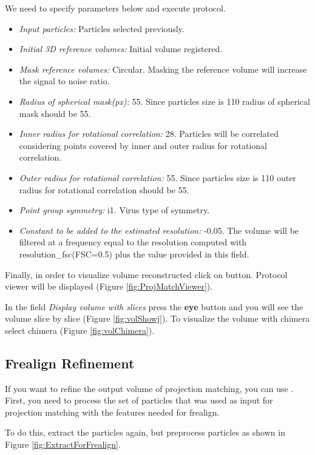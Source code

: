 \documentclass[12pt]{article} %
\begin{document}
 
We need to specify parameters below and execute protocol.
\begin{itemize}
\item \textit{Input particles:} Particles selected previously.
\item \textit{Initial 3D reference volumes:}  Initial volume registered.
\item \textit{Mask reference volumes:} Circular. Masking the reference volume will increase the signal to noise ratio. 
\item \textit{Radius of spherical mask(px):} 55. Since particles size is 110 radius of spherical mask should be 55.
\item \textit{Inner radius for rotational correlation:} 28. Particles will be correlated considering points covered 
by inner and outer radius for rotational correlation.
\item \textit{Outer radius for rotational correlation:} 55. Since particles size is 110 outer radius for rotational correlation should be 55.
\item \textit{Point group symmetry:} i1. Virus type of symmetry.
\item \textit{Constant to be added to the estimated resolution:} -0.05. The volume will be filtered at a frequency equal to
the  resolution computed with resolution\_fsc(FSC=0.5) plus the value provided in this field.

\end{itemize}


Finally, in order to visualize volume reconstructed click on
 button. Protocol viewer will be displayed (Figure \ref{fig:ProjMatchViewer}).


In the field 
\textit{Display volume with slices } press the \textbf {eye} button and you will see the 
volume slice by slice (Figure \ref{fig:volShowj}). To visualize the volume with chimera select
chimera (Figure \ref{fig:volChimera}).


\subsection{Frealign Refinement}

If you want to refine the output volume of projection matching, you can
use . First, you need to process the set of particles
that was used as input for projection matching with the features needed
for frealign.


To do this, extract the particles
again, but preprocess particles as shown in Figure \ref{fig:ExtractForFrealign}.
\end{document}

